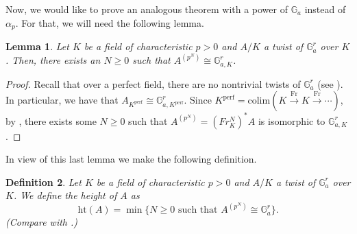 \documentclass[a4paper,english,12pt]{amsart}
\newtheorem{definition}{Definition}[section]
\newtheorem{lemma}[definition]{Lemma}
\numberwithin{equation}{section}
\renewcommand{\geq}{\geqslant}
\renewcommand{\_}{\rule{0.25cm}{0.4pt}}
\begin{document}
Now, we would like to prove an analogous theorem with a power of $\mathbb{G}_{a}$ instead of $\alpha_{p}$. For that, we will need the following lemma.

\begin{lemma}\label{twist trivializa}
    Let $K$ be a field of characteristic $p>0$ and $A/K$ a twist of $\mathbb{G}_{a}^{r}$ over $K$. Then, there exists an $N\geq 0$ such that $A^{(p^{N})}\cong \mathbb{G}_{a,K}^{r}$.
\end{lemma}
\begin{proof}
    Recall that over a perfect field, there are no nontrivial twists of $\mathbb{G}_{a}^{r}$ (see \cite[Exp. XVII, Prop. 4.1.5]{SGA3}). In particular, we have that $A_{K^{\text{perf}}}\cong \mathbb{G}_{a,K^{\text{perf}}}^{r}$. Since $K^{\text{perf}}=\text{colim}(K\xrightarrow{\text{Fr}}K\xrightarrow{\text{Fr}}\cdots)$, by \cite[Corollary 10.64.(2)]{Gortz2020-zv}, there exists some $N\geq 0$ such that $A^{(p^{N})}=(Fr_{K}^{N})^{\ast}A$ is isomorphic to $\mathbb{G}_{a,K}^{r}$.
\end{proof}

In view of this last lemma we make the following definition.

\begin{definition}
    Let $K$ be a field of characteristic $p>0$ and $A/K$ a twist of $\mathbb{G}_{a}^{r}$ over $K$. We define the height of $A$ as
    \[
    \text{ht}(A)=\min\{N\geq 0 \text{ such that $A^{(p^{N})}\cong \mathbb{G}_{a}^{r}$}\}.
    \]
    (Compare with \cite[5.1]{Kambayashi1974-jn}.)
\end{definition}
\end{document}

